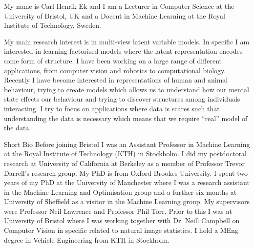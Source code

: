 \documentclass[presentation]{beamer}
\author{Carl Henrik Ek}
\date{\today}
\title{}
\begin{document}
My name is \alert{Carl Henrik Ek} and I am a Lecturer in Computer Science at the University of Bristol, UK and a Docent in Machine Learning at the Royal Institute of Technology, Sweden.

My main research interest is in multi-view latent variable models. In specific I am interested in learning factorised models where the latent representation encodes some form of structure. I have been working on a large range of different applications, from computer vision and robotics to computational biology. Recently I have become interested in representations of human and animal behaviour, trying to create models which allows us to understand how our mental state effects our behaviour and trying to discover structures among individuals interacting. I try to focus on applications where data is scares such that understanding the data is necessary which means that we require “real” model of the data.

Short Bio
Before joining Bristol I was an Assistant Professor in Machine Learning at the Royal Institute of Technology (KTH) in Stockholm. I did my postdoctoral research at University of California at Berkeley as a member of Professor Trevor Darrell’s research group. My PhD is from Oxford Brookes University. I spent two years of my PhD at the University of Manchester where I was a research assistant in the Machine Learning and Optimisation group and a further six months at University of Sheffield as a visitor in the Machine Learning group. My supervisors were Professor Neil Lawrence and Professor Phil Torr. Prior to this I was at University of Bristol where I was working together with Dr. Neill Campbell on Computer Vision in specific related to natural image statistics. I hold a MEng degree in Vehicle Engineering from KTH in Stockholm.
\end{document}
